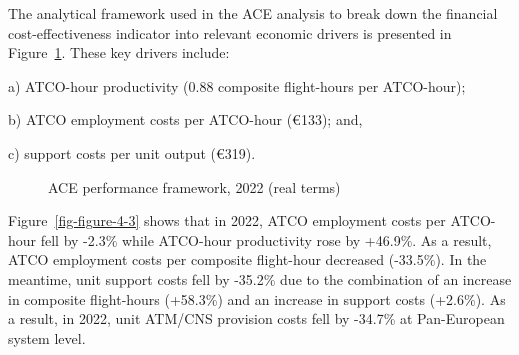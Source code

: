 \documentclass[
  letterpaper,
  DIV=11,
  numbers=noendperiod]{scrreprt}
\begin{document}
The analytical framework used in the ACE analysis to break down the
financial cost-effectiveness indicator into relevant economic drivers is
presented in Figure~\ref{fig-figure-4-2}. These key drivers include:

a) ATCO-hour productivity (0.88 composite flight-hours per ATCO-hour);

b) ATCO employment costs per ATCO-hour (€133); and,

c) support costs per unit output (€319).

\newpage{}

\begin{figure}


\caption{\label{fig-figure-4-2}ACE performance framework, 2022 (real
terms)}

\end{figure}%

Figure~\ref{fig-figure-4-3} shows that in 2022, ATCO employment costs
per ATCO-hour fell by -2.3\% while ATCO-hour productivity rose by
+46.9\%. As a result, ATCO employment costs per composite flight-hour
decreased (-33.5\%). In the meantime, unit support costs fell by -35.2\%
due to the combination of an increase in composite flight-hours
(+58.3\%) and an increase in support costs (+2.6\%). As a result, in
2022, unit ATM/CNS provision costs fell by -34.7\% at Pan-European
system level.
\end{document}
